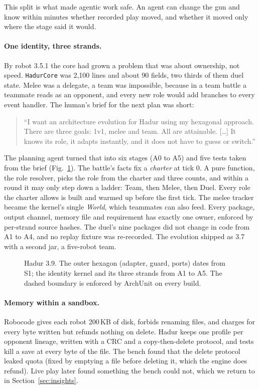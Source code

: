 \documentclass[10pt,twocolumn]{article}
\begin{document}
This split is what made agentic work safe. An agent can change the gun and know within minutes
whether recorded play moved, and whether it moved only where the stage said it would.

\paragraph{One identity, three strands.} By robot 3.5.1 the core had grown a problem that was about
ownership, not speed. \texttt{HadurCore} was 2,100 lines and about 90 fields, two thirds of them
duel state. Melee was a delegate, a team was impossible, because in a team battle a teammate reads
as an opponent, and every new role would add branches to every event handler. The human's brief
for the next plan was short:

\begin{quote}\small
``I want an architecture evolution for Hadur using my hexagonal approach. There are three goals:
1v1, melee and team. All are attainable. [\dots] It knows its role, it adapts instantly, and it
does not have to guess or switch.''
\end{quote}

The planning agent turned that into six stages (A0 to A5) and five tests taken from the brief
(Fig.~\ref{fig:arch}). The battle's facts fix a \emph{charter} at tick 0. A pure function, the
role resolver, picks the role from the charter and three counts, and within a round it may only
step down a ladder: Team, then Melee, then Duel. Every role the charter allows is built and warmed
up before the first tick. The melee tracker became the kernel's single \emph{World}, which
teammates can also feed. Every package, output channel, memory file and requirement has exactly one
owner, enforced by per-strand source hashes. The duel's nine packages did not change in code from
A1 to A4, and no replay fixture was re-recorded. The evolution shipped as 3.7 with a second jar,
a five-robot team.

\begin{figure}[t]
\centering
\resizebox{0.92\textwidth}{!}{}
\caption{Hadur 3.9. The outer hexagon (adapter, guard, ports) dates from S1; the identity kernel
and its three strands from A1 to A5. The dashed boundary is enforced by ArchUnit on every build.}
\label{fig:arch}
\end{figure}

\paragraph{Memory within a sandbox.} Robocode gives each robot 200\,KB of disk, forbids renaming
files, and charges for every byte written but refunds nothing on delete. Hadur keeps one profile
per opponent lineage, written with a CRC and a copy-then-delete protocol, and tests kill a save at
every byte of the file. The bench found that the delete protocol leaked quota (fixed by emptying a
file before deleting it, which the engine does refund). Live play later found something the bench
could not, which we return to in Section~\ref{sec:insights}.
\end{document}
